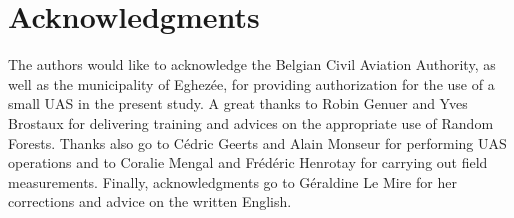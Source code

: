 \documentclass[remotesensing,article,submit,moreauthors,pdftex,12pt,a4paper]{mdpi} %
\begin{document}
\section*{\noindent Acknowledgments}
\vspace{12pt}

The authors would like to acknowledge the Belgian Civil Aviation Authority, as well as the municipality of Eghezée, for providing authorization for the use of a small UAS in the present study. 
A great thanks to Robin Genuer and Yves Brostaux for delivering training and advices on the appropriate use of Random Forests. 
Thanks also go to C\'edric Geerts and Alain Monseur for performing UAS operations and to Coralie Mengal and Fr\'ed\'eric Henrotay for carrying out field measurements. 
Finally, acknowledgments go to G\'eraldine Le Mire for her corrections and advice on the written English.



\makeatletter
\renewcommand\@biblabel[1]{#1. }
\makeatother


\end{document}
